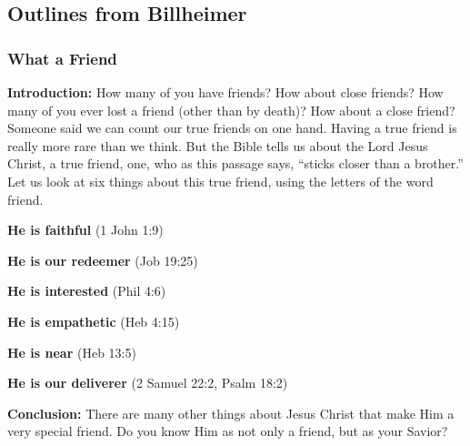 \subsection{Outlines from Billheimer}

\subsubsection{What a Friend}

\noindent  \textbf{Introduction: } How many of you have friends? How about close friends? How many of you ever lost a friend (other than by death)? How about a close friend? Someone said we can count our true friends on one hand. Having a true friend is really more rare than we think. But the Bible tells us about the Lord Jesus Christ, a true friend, one, who as this passage says, ``sticks closer than a brother.'' Let us look at six things about this true friend, using the letters of the word friend.
\begin{compactenum}[I.]
    \item \textbf{He is faithful} (1 John 1:9)
    \item \textbf{He is our redeemer} (Job 19:25)
    \item \textbf{He is interested} (Phil 4:6)
    \item \textbf{He is empathetic} (Heb 4:15)
    \item \textbf{He is near} (Heb 13:5)
    \item \textbf{He is our deliverer} (2 Samuel 22:2, Psalm 18:2)
\end{compactenum}
\textbf{Conclusion: } There are many other things about Jesus Christ that make Him a very special friend. Do you know Him as not only a friend, but as your Savior?



